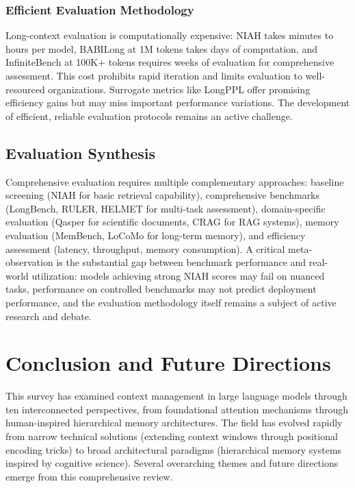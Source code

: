 \documentclass[11pt,letterpaper]{article}
\begin{document}
\subsubsection{Efficient Evaluation Methodology}

Long-context evaluation is computationally expensive: NIAH takes minutes to hours per model, BABILong at 1M tokens takes days of computation, and InfiniteBench at 100K+ tokens requires weeks of evaluation for comprehensive assessment. This cost prohibits rapid iteration and limits evaluation to well-resourced organizations. Surrogate metrics like LongPPL offer promising efficiency gains but may miss important performance variations. The development of efficient, reliable evaluation protocols remains an active challenge.

\subsection{Evaluation Synthesis}

Comprehensive evaluation requires multiple complementary approaches: baseline screening (NIAH for basic retrieval capability), comprehensive benchmarks (LongBench, RULER, HELMET for multi-task assessment), domain-specific evaluation (Qasper for scientific documents, CRAG for RAG systems), memory evaluation (MemBench, LoCoMo for long-term memory), and efficiency assessment (latency, throughput, memory consumption). A critical meta-observation is the substantial gap between benchmark performance and real-world utilization: models achieving strong NIAH scores may fail on nuanced tasks, performance on controlled benchmarks may not predict deployment performance, and the evaluation methodology itself remains a subject of active research and debate.


\section{Conclusion and Future Directions}
\label{sec:conclusion}

This survey has examined context management in large language models through ten interconnected perspectives, from foundational attention mechanisms through human-inspired hierarchical memory architectures. The field has evolved rapidly from narrow technical solutions (extending context windows through positional encoding tricks) to broad architectural paradigms (hierarchical memory systems inspired by cognitive science). Several overarching themes and future directions emerge from this comprehensive review.
\end{document}
